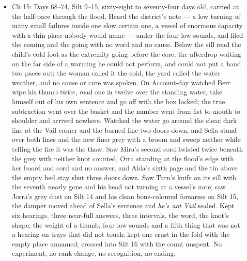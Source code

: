 \documentclass{design/chronicle}
\begin{document}
{\begin{itemize}[leftmargin=1.4em,itemsep=1pt,topsep=3pt,parsep=0pt]
\item Ch 15: Days 68–74, Silt 9–15, sixty-eight to seventy-four days old, carried at the half-pace through the flood. Heard the district’s note --- a low turning of many small failures inside one slow certain one, a vessel of enormous capacity with a thin place nobody would name --- under the four low sounds, and filed the coming and the going with no word and no cause. Below the sill read the child’s cold foot as the extremity going before the core, the afterdrop waiting on the far side of a warming he could not perform, and could not put a hand two paces out; the woman called it the cold, the yard called the water weather, and no cause or cure was spoken. On Account-day watched Berr wipe his thumb twice, read one in twelve over the standing water, take himself out of his own sentence and go off with the box locked; the true subtraction went over the basket and the number went from fist to mouth to shoulder and arrived nowhere. Watched the water go around the clean dark line at the Vail corner and the burned line two doors down, and Sella stand over both lines and the new finer grey with a broom and sweep neither while telling the fire it was the thaw. Saw Mira’s second cord twisted twice beneath the grey with neither knot counted, Orra standing at the flood’s edge with her board and cord and no answer, and Alda’s sixth page and the tin above the empty bed stay shut three doors down. Saw Tarn’s knife on its sill with the seventh nearly gone and his head not turning at a vessel’s note; saw Jorra’s grey dust on Silt 14 and his clean bone-coloured forearms on Silt 15, the damper moved ahead of Sella’s sentence and \emph{he’s not Vail} sealed. Kept six hearings, three near-full answers, three intervals, the word, the knot’s shape, the weight of a thumb, four low sounds and a fifth thing that was not a hearing on trays that did not touch; kept one crust in the fold with the empty place unnamed; crossed into Silt 16 with the count unspent. No experiment, no rank change, no recognition, no ending.

\end{itemize}

\begin{itemize}[leftmargin=1.4em,itemsep=1pt,topsep=3pt,parsep=0pt]


\end{itemize}}
\end{document}
